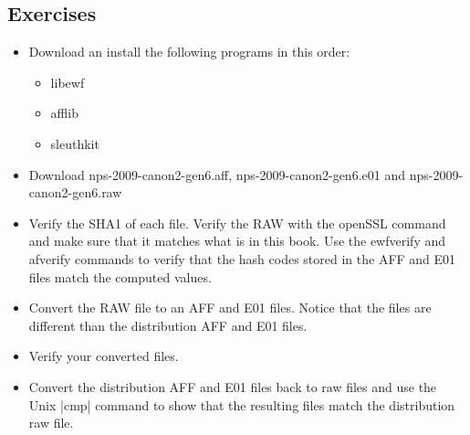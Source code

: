 \subsection{Exercises}
\begin{itemize}
\item Download an install the following programs in this order:
\begin{itemize}
\item   libewf
\item afflib
\item  sleuthkit
\end{itemize}
\item Download nps-2009-canon2-gen6.aff, nps-2009-canon2-gen6.e01 and nps-2009-canon2-gen6.raw
\item Verify the SHA1 of each file. Verify the RAW with the openSSL
  command and make sure that it matches what is in this book. Use the
  ewfverify and afverify commands to verify that the hash codes stored
  in the AFF and E01 files match the computed values.
\item Convert the RAW file to an AFF and E01 files. Notice that the
  files are different than the distribution AFF and E01 files.
\item Verify your converted files.
\item Convert the distribution AFF and E01 files back to raw files and
  use the Unix |cmp| command to show that the resulting files match
  the distribution raw file.
\end{itemize}

